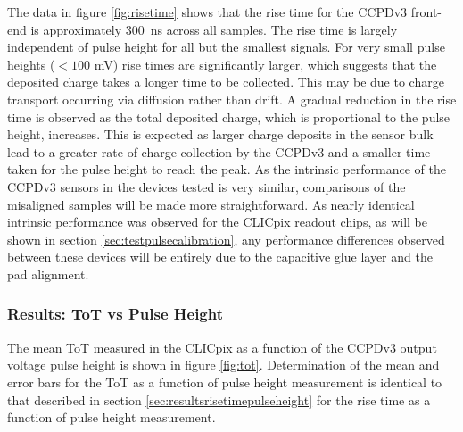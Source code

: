 The data in figure \ref{fig:risetime} shows that the rise time for the CCPDv3 front-end is approximately 300~ns across all samples.  The rise time is largely independent of pulse height for all but the smallest signals.  For very small pulse heights ($< 100$ mV) rise times are significantly larger, which suggests that the deposited charge takes a longer time to be collected.  This may be due to charge transport occurring via diffusion rather than drift.  A gradual reduction in the rise time is observed as the total deposited charge, which is proportional to the pulse height, increases.  This is expected as larger charge deposits in the sensor bulk lead to a greater rate of charge collection by the CCPDv3 and a smaller time taken for the pulse height to reach the peak.  As the intrinsic performance of the CCPDv3 sensors in the devices tested is very similar, comparisons of the misaligned samples will be made more straightforward.  As nearly identical intrinsic performance was observed for the CLICpix readout chips, as will be shown in section \ref{sec:testpulsecalibration}, any performance differences observed between these devices will be entirely due to the capacitive glue layer and the pad alignment.    


\subsubsection{Results: ToT vs Pulse Height}
\label{sec:resultstotpulseheight}
The mean ToT measured in the CLICpix as a function of the CCPDv3 output voltage pulse height is shown in figure \ref{fig:tot}.  Determination of the mean and error bars for the ToT as a function of pulse height measurement is identical to that described in section \ref{sec:resultsrisetimepulseheight} for the rise time as a function of pulse height measurement.   

